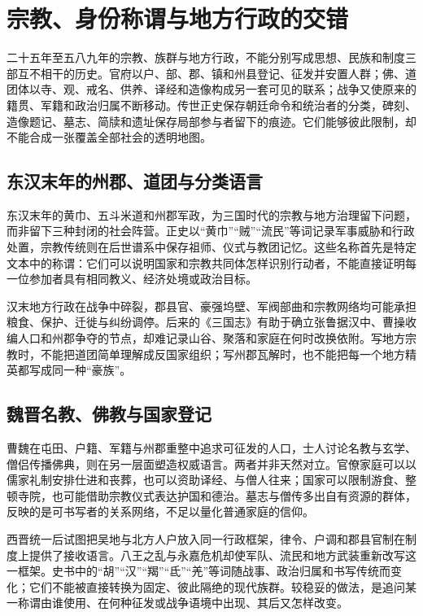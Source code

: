 \section{宗教、身份称谓与地方行政的交错}
\label{sec:ns-religion-identification-local-administration}

二十五年至五八九年的宗教、族群与地方行政，不能分别写成思想、民族和制度三部互不相干的历史。官府以户、部、郡、镇和州县登记、征发并安置人群；佛、道团体以寺、观、戒名、供养、译经和造像构成另一套可见的联系；战争又使原来的籍贯、军籍和政治归属不断移动。传世正史保存朝廷命令和统治者的分类，碑刻、造像题记、墓志、简牍和遗址保存局部参与者留下的痕迹。它们能够彼此限制，却不能合成一张覆盖全部社会的透明地图。

\subsection{东汉末年的州郡、道团与分类语言}

东汉末年的黄巾、五斗米道和州郡军政，为三国时代的宗教与地方治理留下问题，而非留下三种封闭的社会阵营。正史以“黄巾”“贼”“流民”等词记录军事威胁和行政处置，宗教传统则在后世谱系中保存祖师、仪式与教团记忆。这些名称首先是特定文本中的称谓：它们可以说明国家和宗教共同体怎样识别行动者，不能直接证明每一位参加者具有相同教义、经济处境或政治目标。

汉末地方行政在战争中碎裂，郡县官、豪强坞壁、军阀部曲和宗教网络均可能承担粮食、保护、迁徙与纠纷调停。后来的《三国志》有助于确立张鲁据汉中、曹操收编人口和州郡争夺的节点，却难记录山谷、聚落和家庭在何时改换依附。写地方宗教时，不能把道团简单理解成反国家组织；写州郡瓦解时，也不能把每一个地方精英都写成同一种“豪族”。

\subsection{魏晋名教、佛教与国家登记}

曹魏在屯田、户籍、军籍与州郡重整中追求可征发的人口，士人讨论名教与玄学、僧侣传播佛典，则在另一层面塑造权威语言。两者并非天然对立。官僚家庭可以以儒家礼制安排仕进和丧葬，也可以资助译经、与僧人往来；国家可以限制游食、整顿寺院，也可能借助宗教仪式表达护国和德治。墓志与僧传多出自有资源的群体，反映的是可书写者的关系网络，不足以量化普通家庭的信仰。

西晋统一后试图把吴地与北方人户放入同一行政框架，律令、户调和郡县官制在制度上提供了接收语言。八王之乱与永嘉危机却使军队、流民和地方武装重新改写这一框架。史书中的“胡”“汉”“羯”“氐”“羌”等词随战事、政治归属和书写传统而变化；它们不能被直接转换为固定、彼此隔绝的现代族群。较稳妥的做法，是追问某一称谓由谁使用、在何种征发或战争语境中出现、其后又怎样改变。

